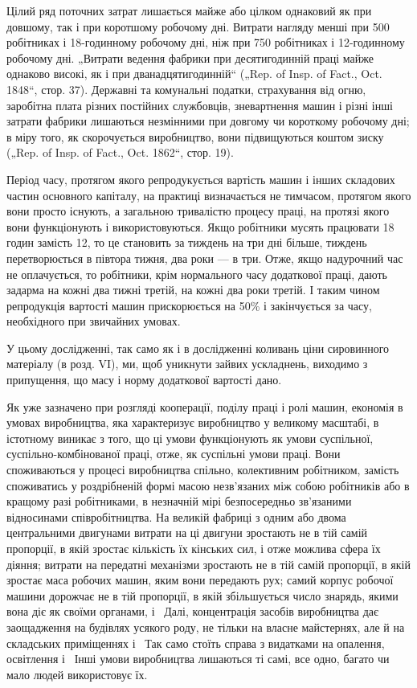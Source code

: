 Цілий ряд поточних затрат лишається майже або цілком
однаковий як при довшому, так і при коротшому робочому дні.
Витрати нагляду менші при 500 робітниках і 18-годинному робочому
дні, ніж при 750 робітниках і 12-годинному робочому дні.
„Витрати ведення фабрики при десятигодинній праці майже однаково
високі, як і при дванадцятигодинній“ („Rep. of Insp. of
Fact., Oct. 1848“, стор. 37). Державні та комунальні податки,
страхування від огню, заробітна плата різних постійних службовців,
зневартнення машин і різні інші затрати фабрики лишаються
незмінними при довгому чи короткому робочому дні;
в міру того, як скорочується виробництво, вони підвищуються
коштом зиску („Rep. of Insp. of Fact., Oct. 1862“, стор. 19).

Період часу, протягом якого репродукується вартість машин
і інших складових частин основного капіталу, на практиці визначається
не тимчасом, протягом якого вони просто існують,
а загальною тривалістю процесу праці, на протязі якого вони
функціонують і використовуються. Якщо робітники мусять працювати
18 годин замість 12, то це становить за тиждень на три
дні більше, тиждень перетворюється в півтора тижня, два
роки — в три. Отже, якщо надурочний час не оплачується, то
робітники, крім нормального часу додаткової праці, дають задарма
на кожні два тижні третій, на кожні два роки третій.
І таким чином репродукція вартості машин прискорюється на 50\%
і закінчується за  часу, необхідного при звичайних умовах.

У цьому дослідженні, так само як і в дослідженні коливань
ціни сировинного матеріалу (в розд. VI), ми, щоб уникнути
зайвих ускладнень, виходимо з припущення, що масу і норму
додаткової вартості дано.

Як уже зазначено при розгляді кооперації, поділу праці
і ролі машин, економія в умовах виробництва, яка характеризує
виробництво у великому масштабі, в істотному виникає з того,
що ці умови функціонують як умови суспільної, суспільно-комбінованої
праці, отже, як суспільні умови праці. Вони
споживаються у процесі виробництва спільно, колективним робітником,
замість споживатись у роздрібненій формі масою
незв’язаних між собою робітників або в кращому разі робітниками,
в незначній мірі безпосередньо зв’язаними відносинами співробітництва.
На великій фабриці з одним або двома центральними
двигунами витрати на ці двигуни зростають не в тій самій пропорції,
в якій зростає кількість їх кінських сил, і отже можлива сфера
їх діяння; витрати на передатні механізми зростають не в тій самій
пропорції, в якій зростає маса робочих машин, яким вони передають
рух; самий корпус робочої машини дорожчає не в тій
пропорції, в якій збільшується число знарядь, якими вона діє
як своїми органами, і~ Далі, концентрація засобів виробництва
дає заощадження на будівлях усякого роду, не тільки
на власне майстернях, але й на складських приміщеннях і~
Так само стоїть справа з видатками на опалення, освітлення
і~ Інші умови виробництва лишаються ті самі, все одно,
багато чи мало людей використовує їх.

